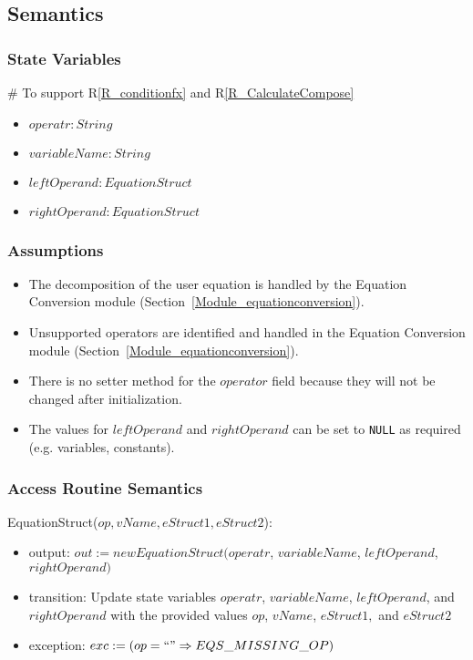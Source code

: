 \documentclass[12pt, titlepage]{article}
\newcommand{\rref}[1]{R\ref{#1}}
\begin{document}
\subsection{Semantics}

\subsubsection{State Variables}

\# To support \rref{R_conditionfx} and \rref{R_CalculateCompose}
\begin{itemize}
	\item $operatr : String$
	\item $variableName : String$
	\item $leftOperand : EquationStruct$
	\item $rightOperand : EquationStruct$
\end{itemize}

\subsubsection{Assumptions}

\begin{itemize}
	\item The decomposition of the user equation is handled by the Equation 
	Conversion module (Section~\ref{Module_equationconversion}).
	\item Unsupported operators are identified and handled in the Equation 
	Conversion module (Section~\ref{Module_equationconversion}).
	\item There is no setter method for the $operator$ field because they will 
	not be changed after initialization.
	\item The values for $leftOperand$ and $rightOperand$ can be set to 
	\texttt{NULL} as required (e.g. variables, constants).
\end{itemize}

\subsubsection{Access Routine Semantics}

\noindent EquationStruct($op, vName, eStruct1, eStruct2$):
\begin{itemize}
	\item output: $out := new EquationStruct(operatr$, $variableName$, 
	$leftOperand$, $rightOperand)$
	\item transition: Update state variables $operatr$, $variableName$, 
	$leftOperand$, and $rightOperand$ with the provided values $op$, $vName$, 
	$eStruct1,$ and $eStruct2$
	\item exception: $exc := \\
	(op = ``" \Rightarrow EQS\_MISSING\_OP)$
\end{itemize}
\end{document}
